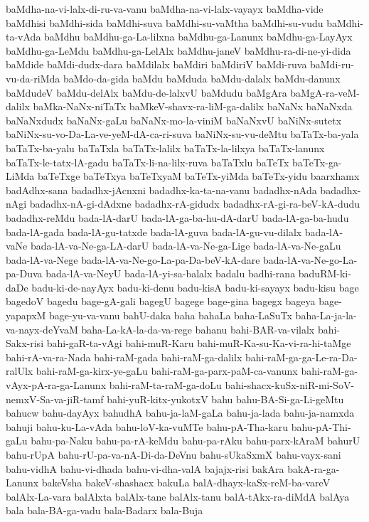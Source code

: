 {baMdha-na-vi-lalx-di-ru-va-vanu
baMdha-na-vi-lalx-vayayx
baMdha-vide
baMdhisi
baMdhi-sida
baMdhi-suva
baMdhi-su-vaMtha
baMdhi-su-vudu
baMdhi-ta-vAda
baMdhu
baMdhu-ga-La-lilxna
baMdhu-ga-Lanunx
baMdhu-ga-LayAyx
baMdhu-ga-LeMdu
baMdhu-ga-LelAlx
baMdhu-janeV
baMdhu-ra-di-ne-yi-dida
baMdide
baMdi-dudx-dara
baMdilalx
baMdiri
baMdiriV
baMdi-ruva
baMdi-ru-vu-da-riMda
baMdo-da-gida
baMdu
baMduda
baMdu-dalalx
baMdu-danunx
baMdudeV
baMdu-delAlx
baMdu-de-lalxvU
baMdudu
baMgAra
baMgA-ra-veM-dalilx
baMka-NaNx-niTaTx
baMkeV-shavx-ra-liM-ga-dalilx
baNaNx
baNaNxda
baNaNxdudx
baNaNx-gaLu
baNaNx-mo-la-viniM
baNaNxvU
baNiNx-sutetx
baNiNx-su-vo-Da-La-ve-yeM-dA-ca-ri-suva
baNiNx-su-vu-deMtu
baTaTx-ba-yala
baTaTx-ba-yalu
baTaTxla
baTaTx-lalilx
baTaTx-la-lilxya
baTaTx-lanunx
baTaTx-le-tatx-lA-gadu
baTaTx-li-na-lilx-ruva
baTaTxlu
baTeTx
baTeTx-ga-LiMda
baTeTxge
baTeTxya
baTeTxyaM
baTeTx-yiMda
baTeTx-yidu
baarxhamx
badAdhx-sana
badadhx-jAcnxni
badadhx-ka-ta-na-vanu
badadhx-nAda
badadhx-nAgi
badadhx-nA-gi-dAdxne
badadhx-rA-gidudx
badadhx-rA-gi-ra-beV-kA-dudu
badadhx-reMdu
bada-lA-darU
bada-lA-ga-ba-hu-dA-darU
bada-lA-ga-ba-hudu
bada-lA-gada
bada-lA-gu-tatxde
bada-lA-guva
bada-lA-gu-vu-dilalx
bada-lA-vaNe
bada-lA-va-Ne-ga-LA-darU
bada-lA-va-Ne-ga-Lige
bada-lA-va-Ne-gaLu
bada-lA-va-Nege
bada-lA-va-Ne-go-La-pa-Da-beV-kA-dare
bada-lA-va-Ne-go-La-pa-Duva
bada-lA-va-NeyU
bada-lA-yi-sa-balalx
badalu
badhi-rana
baduRM-ki-daDe
badu-ki-de-nayAyx
badu-ki-denu
badu-kisA
badu-ki-sayayx
badu-kisu
bage
bagedoV
bagedu
bage-gA-gali
bagegU
bagege
bage-gina
bagegx
bageya
bage-yapapxM
bage-yu-va-vanu
bahU-daka
baha
bahaLa
baha-LaSuTx
baha-La-ja-la-va-nayx-deYvaM
baha-La-kA-la-da-va-rege
bahanu
bahi-BAR-va-vilalx
bahi-Sakx-risi
bahi-gaR-ta-vAgi
bahi-muR-Karu
bahi-muR-Ka-su-Ka-vi-ra-hi-taMge
bahi-rA-va-ra-Nada
bahi-raM-gada
bahi-raM-ga-dalilx
bahi-raM-ga-ga-Le-ra-Da-ralUlx
bahi-raM-ga-kirx-ye-gaLu
bahi-raM-ga-parx-paM-ca-vanunx
bahi-raM-ga-vAyx-pA-ra-ga-Lanunx
bahi-raM-ta-raM-ga-doLu
bahi-shacx-kuSx-niR-mi-SoV-nemxV-Sa-va-jiR-tamf
bahi-yuR-kitx-yukotxV
bahu
bahu-BA-Si-ga-Li-geMtu
bahucw
bahu-dayAyx
bahudhA
bahu-ja-laM-gaLa
bahu-ja-lada
bahu-ja-namxda
bahuji
bahu-ku-La-vAda
bahu-loV-ka-vuMTe
bahu-pA-Tha-karu
bahu-pA-Thi-gaLu
bahu-pa-Naku
bahu-pa-rA-keMdu
bahu-pa-rAku
bahu-parx-kAraM
bahurU
bahu-rUpA
bahu-rU-pa-va-nA-Di-da-DeVnu
bahu-sUkaSxmX
bahu-vayx-sani
bahu-vidhA
bahu-vi-dhada
bahu-vi-dha-valA
bajajx-risi
bakAra
bakA-ra-ga-Lanunx
bakeVsha
bakeV-shashacx
bakuLa
balA-dhayx-kaSx-reM-ba-vareV
balAlx-La-vara
balAlxta
balAlx-tane
balAlx-tanu
balA-tAkx-ra-diMdA
balAya
bala
bala-BA-ga-vadu
bala-Badarx
bala-Buja
}
